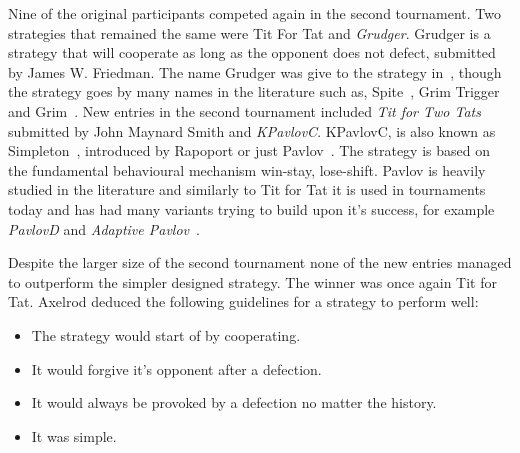 Nine of the original participants competed again in the second tournament. Two
strategies that remained the same were Tit For Tat and \textit{Grudger}. Grudger
is a strategy that will cooperate as long as the opponent does not defect,
submitted by James W. Friedman. The name Grudger was give to the strategy
in~\cite{Li20142}, though the strategy goes by many names in the literature such
as, Spite~\cite{Beaufils1997}, Grim Trigger~\cite{Banks1990} and
Grim~\cite{Van2015}. New entries in the second tournament included \textit{Tit
for Two Tats} submitted by John Maynard Smith and \textit{KPavlovC}. KPavlovC,
is also known as Simpleton~\cite{rapoport1965}, introduced by Rapoport or just
Pavlov~\cite{Nowak1993}. The strategy is based on the fundamental behavioural
mechanism win-stay, lose-shift. Pavlov is heavily studied in the literature and
similarly to Tit for Tat it is used in tournaments today and has
had many variants trying to build upon it's success, for example
\textit{PavlovD} and \textit{Adaptive Pavlov}~\cite{Li2007}.

Despite the larger size of the second tournament none of the new entries managed
to outperform the simpler designed strategy. The winner was once again Tit for
Tat. Axelrod deduced the following guidelines for a strategy to perform well:

\begin{itemize}
    \item The strategy would start of by cooperating.
    \item It would forgive it's opponent after a defection.
    \item It would always be provoked by a defection no matter the history.
    \item It was simple.
\end{itemize}

